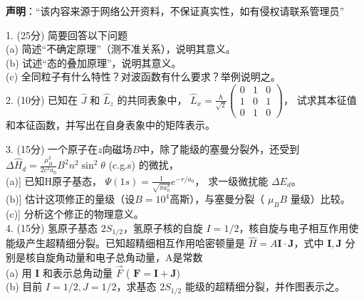 
\textbf{声明}：“该内容来源于网络公开资料，不保证真实性，如有侵权请联系管理员”



1. (25分) 简要回答以下问题\\
(a) 简述“不确定原理”（测不准关系），说明其意义。\\
(b) 试述“态的叠加原理”，说明其意义。\\
(c) 全同粒子有什么特性？对波函数有什么要求？举例说明之。\\

2. (10分) 已知在 $\hat{J}$ 和 $\hat{L}_z$ 的共同表象中， $\hat{L}_x = \frac{\hbar}{\sqrt{2}} \begin{pmatrix} 
0 & 1 & 0 \\
1 & 0 & 1 \\
0 & 1 & 0 
\end{pmatrix}$， 试求其本征值和本征函数，并写出在自身表象中的矩阵表示。

3. (15分) 一个原子在$z$向磁场$B$中，除了能级的塞曼分裂外，还受到 $\Delta \hat{H}_d = \frac{\mu_B^2}{2c^2a_0} B^2 n^2 \sin^2 \theta$ (c.g.s) 的微扰，\\
(a)] 已知H原子基态， $\Psi (1s) = \frac{1}{\sqrt{\pi a_0^3}} e^{-r/a_0}$， 求一级微扰能 $ \Delta E_d$。\\
(b)] 估计这项修正的量级（设$B=10^4$高斯），与塞曼分裂（ $\mu_B B$ 量级）比较。\\
(c)] 分析这个修正的物理意义。\\

4. (15分) 氢原子基态 $2S_{1/2}$，氢原子核的自旋 $I=1/2$，核自旋与电子相互作用使能级产生超精细分裂。已知超精细相互作用哈密顿量是 $\hat H = A \mathbf{I} \cdot \mathbf{J}$，式中 $\mathbf{I}, \mathbf{J}$ 分别是核自旋角动量和电子总角动量，A是常数\\
(a) 用 $\mathbf{I}$ 和表示总角动量 $\vec{F}$ ( $\mathbf{F} = \mathbf{I} + \mathbf{J}$)\\
(b) 目前 $I = 1/2, J = 1/2$，求基态 $2S_{1/2}$ 能级的超精细分裂，并作图表示之。\\
